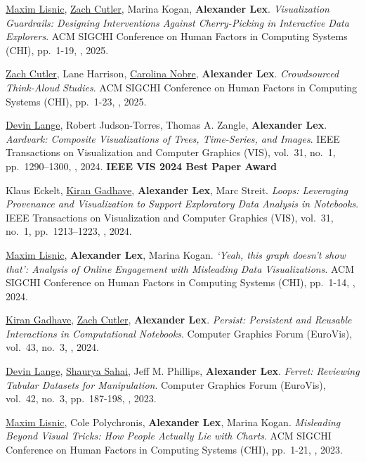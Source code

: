 \item \uline{Maxim Lisnic}, \uline{Zach Cutler}, Marina Kogan, \textbf{Alexander Lex}. \textit{Visualization Guardrails: Designing Interventions Against Cherry-Picking in Interactive Data Explorers}. ACM SIGCHI Conference on Human Factors in Computing Systems (CHI), pp.\ 1-19, , 2025. 
\item \uline{Zach Cutler}, Lane Harrison, \uline{Carolina Nobre}, \textbf{Alexander Lex}. \textit{Crowdsourced Think-Aloud Studies}. ACM SIGCHI Conference on Human Factors in Computing Systems (CHI), pp.\ 1-23, , 2025. 
\item \uline{Devin Lange}, Robert Judson-Torres, Thomas A. Zangle, \textbf{Alexander Lex}. \textit{Aardvark: Composite Visualizations of Trees, Time-Series, and Images}. IEEE Transactions on Visualization and Computer Graphics (VIS), vol.\ 31, no.\ 1, pp.\ 1290--1300, , 2024. \textbf{IEEE VIS 2024 Best Paper Award}
\item Klaus Eckelt, \uline{Kiran Gadhave}, \textbf{Alexander Lex}, Marc Streit. \textit{Loops: Leveraging Provenance and Visualization to Support Exploratory Data Analysis in Notebooks}. IEEE Transactions on Visualization and Computer Graphics (VIS), vol.\ 31, no.\ 1, pp.\ 1213--1223, , 2024. 
\item \uline{Maxim Lisnic}, \textbf{Alexander Lex}, Marina Kogan. \textit{`Yeah, this graph doesn't show that': Analysis of Online Engagement with Misleading Data Visualizations}. ACM SIGCHI Conference on Human Factors in Computing Systems (CHI), pp.\ 1-14, , 2024. 
\item \uline{Kiran Gadhave}, \uline{Zach Cutler}, \textbf{Alexander Lex}. \textit{Persist: Persistent and Reusable Interactions in Computational Notebooks}. Computer Graphics Forum (EuroVis), vol.\ 43, no.\ 3, , 2024. 
\item \uline{Devin Lange}, \uline{Shaurya Sahai}, Jeff M. Phillips, \textbf{Alexander Lex}. \textit{Ferret: Reviewing Tabular Datasets for Manipulation}. Computer Graphics Forum (EuroVis), vol.\ 42, no.\ 3, pp.\ 187-198, , 2023. 
\item \uline{Maxim Lisnic}, Cole Polychronis, \textbf{Alexander Lex}, Marina Kogan. \textit{Misleading Beyond Visual Tricks: How People Actually Lie with Charts}. ACM SIGCHI Conference on Human Factors in Computing Systems (CHI), pp.\ 1-21, , 2023. 

